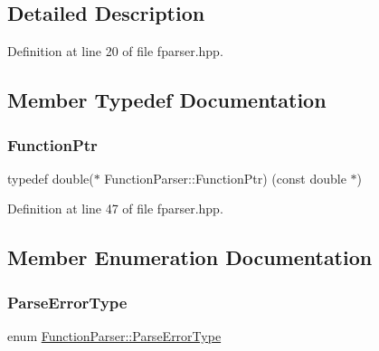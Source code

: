 \subsection{Detailed Description}


Definition at line 20 of file fparser.\+hpp.



\subsection{Member Typedef Documentation}
\mbox{\label{class_function_parser_acca53651fb8f1c7a44e3d2cac7e62455}} 
\subsubsection{\texorpdfstring{Function\+Ptr}{FunctionPtr}}
{\footnotesize\ttfamily typedef double($\ast$ Function\+Parser\+::\+Function\+Ptr) (const double $\ast$)}



Definition at line 47 of file fparser.\+hpp.



\subsection{Member Enumeration Documentation}
\mbox{\label{class_function_parser_a0bb74d288d02ba86367cc1c85351c8e7}} 
\subsubsection{\texorpdfstring{Parse\+Error\+Type}{ParseErrorType}}
{\footnotesize\ttfamily enum \hyperlink{class_function_parser_a0bb74d288d02ba86367cc1c85351c8e7}{Function\+Parser\+::\+Parse\+Error\+Type}}

